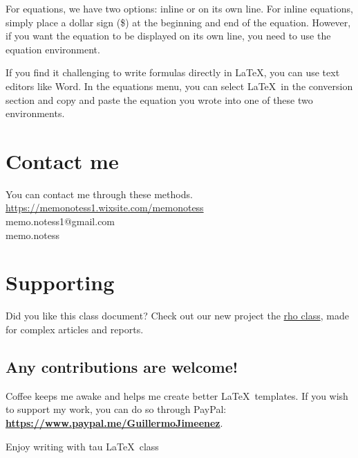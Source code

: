 \documentclass[9pt,a4paper,twocolumn,twoside]{tau-class/tau}
\begin{document}
        For equations, we have two options: inline or on its own line. For inline equations, simply place a dollar sign (\$) at the beginning and end of the equation. However, if you want the equation to be displayed on its own line, you need to use the equation environment.
        
        If you find it challenging to write formulas directly in \LaTeX, you can use text editors like Word. In the equations menu, you can select \LaTeX\ in the conversion section and copy and paste the equation you wrote into one of these two environments.

\section{Contact me}

    You can contact me through these methods.\\
    
    \noindent\faWix\hspace{5pt}\href{https://memonotess1.wixsite.com/memonotess}{https://memonotess1.wixsite.com/memonotess} \\
    \faEnvelope[regular]\hspace{7pt}memo.notess1@gmail.com \\
    \faInstagram\hspace{8pt}memo.notess

\section{Supporting}

    Did you like this class document? Check out our new project the \href{https://es.overleaf.com/latex/templates/rho-class-academic-article-template/bpgjxjjqhtfy}{rho class}, made for complex articles and reports.

    \subsection*{Any contributions are welcome!}
    
        Coffee keeps me awake and helps me create better \LaTeX\ templates. If you wish to support my work, you can do so through PayPal:\\
        \textbf{\url{https://www.paypal.me/GuillermoJimeenez}}.
        
        \begin{center}
            Enjoy writing with tau \LaTeX\ class\hspace{5pt}\faChessKnight 
        \end{center}


\printbibliography

\end{document}
